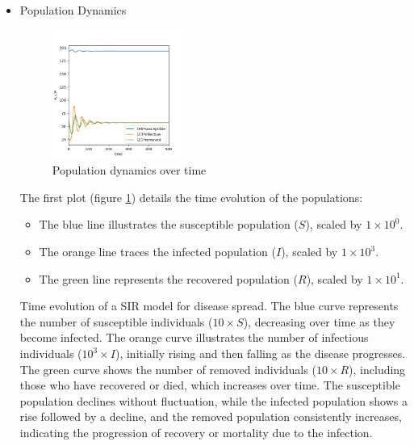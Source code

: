 \begin{itemize}

\begin{itemize}
\item{Population Dynamics}


\begin{figure}[H]
    \centering
    \includegraphics[width=0.4\textwidth]{images/task5/ex4_t5_1a.png}
    \caption{Population dynamics over time}
    \label{fig:task5_1a}
\end{figure}


The first plot (figure \ref{fig:task5_1a}) details the time evolution of the populations:
    \begin{itemize}
        \item The blue line illustrates the susceptible population ($S$), scaled by $1 \times 10^0$.
        \item The orange line traces the infected population ($I$), scaled by $1 \times 10^3$.
        \item The green line represents the recovered population ($R$), scaled by $1 \times 10^1$.
    \end{itemize}

Time evolution of a SIR model for disease spread. The blue curve represents the number of susceptible individuals ($10 \times S$), decreasing over time as they become infected. The orange curve illustrates the number of infectious individuals ($10^3 \times I$), initially rising and then falling as the disease progresses. The green curve shows the number of removed individuals ($10 \times R$), including those who have recovered or died, which increases over time. The susceptible population declines without fluctuation, while the infected population shows a rise followed by a decline, and the removed population consistently increases, indicating the progression of recovery or mortality due to the infection.




\end{itemize}
\end{itemize}
